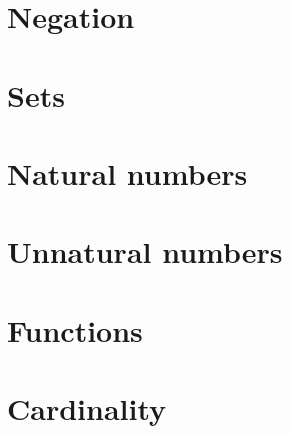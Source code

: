 \section{Negation}
\label{s:negation}

\section{Sets}
\label{s:sets}

\section{Natural numbers}
\label{s:nats}
\label{s:induction}

\section{Unnatural numbers}
\label{s:unnats}
\label{s:other-numbers}

\section{Functions}
\label{s:functions}

\section{Cardinality}
\label{s:cardinality}